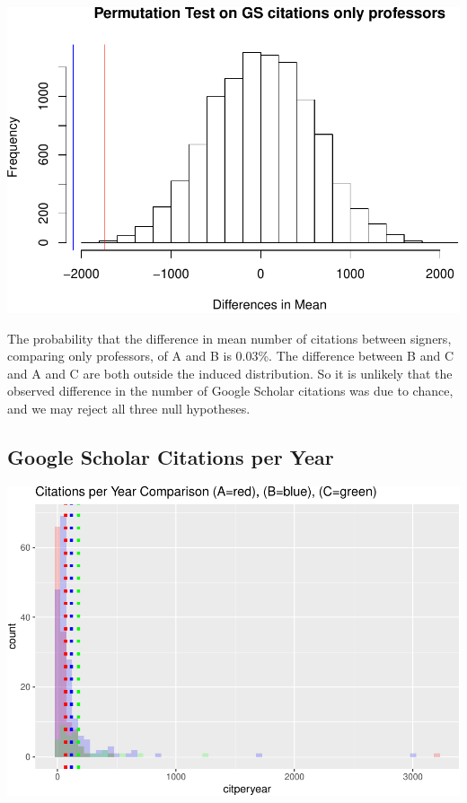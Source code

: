 \documentclass[]{article}
\begin{document}
\includegraphics{final_files/figure-latex/unnamed-chunk-64-1.pdf}

The probability that the difference in mean number of citations between
signers, comparing only professors, of A and B is 0.03\%. The difference
between B and C and A and C are both outside the induced distribution.
So it is unlikely that the observed difference in the number of Google
Scholar citations was due to chance, and we may reject all three null
hypotheses.

\hypertarget{google-scholar-citations-per-year}{%
\subsection{Google Scholar Citations per
Year}\label{google-scholar-citations-per-year}}

\includegraphics{final_files/figure-latex/unnamed-chunk-66-1.pdf}
\end{document}
